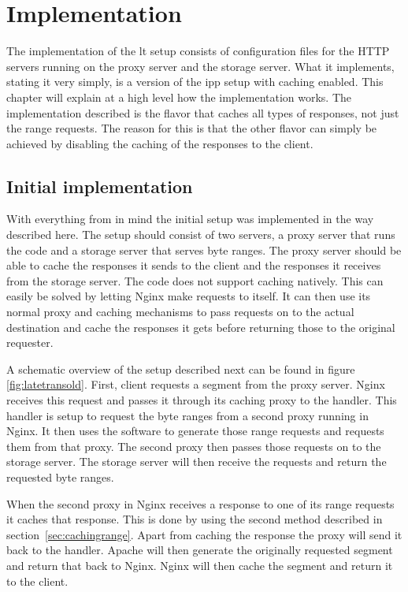 \documentclass[twoside,openright]{uva-bachelor-thesis}
\begin{document}
\chapter{Implementation}
The implementation of the \gls{lt} setup consists of configuration files for the
HTTP servers running on the proxy server and the storage server. What it
implements, stating it very simply, is a version of the \gls{ipp} setup with
caching enabled. This chapter will explain at a high level how the
implementation works. The implementation described is the flavor that caches all
types of responses, not just the range requests. The reason for this is that the
other flavor can simply be achieved by disabling the caching of the responses to
the client.


\section{Initial implementation}\label{sec:initimplement}
With everything from  in mind the initial \lt setup was
implemented in the way described here. The setup should consist of two servers,
a proxy server that runs the \usp code and a storage server that serves byte
ranges. The proxy server should be able to cache the responses it sends to the
client and the responses it receives from the storage server. The \usp code does
not support caching natively. This can easily be solved by letting Nginx make
requests to itself. It can then use its normal proxy and caching mechanisms to
pass requests on to the actual destination and cache the responses it gets
before returning those to the original requester.

A schematic overview of the setup described next can be found in figure
\vref{fig:latetransold}. First, client requests a segment from the proxy server.
Nginx receives this request and passes it through its caching proxy to the
\ipplong handler. This handler is setup to request the byte ranges from a second
proxy running in Nginx. It then uses the \usp software to generate those range
requests and requests them from that proxy. The second proxy then passes those
requests on to the storage server. The storage server will then receive the
requests and return the requested byte ranges.

When the second proxy in Nginx receives a response to one of its range requests
it caches that response. This is done by using the second method described in
section~\ref{sec:cachingrange}. Apart from caching the response the proxy will
send it back to the \ipplong handler. Apache will then generate the originally requested
segment and return that back to Nginx.  Nginx will then cache the segment and
return it to the client.
\end{document}
